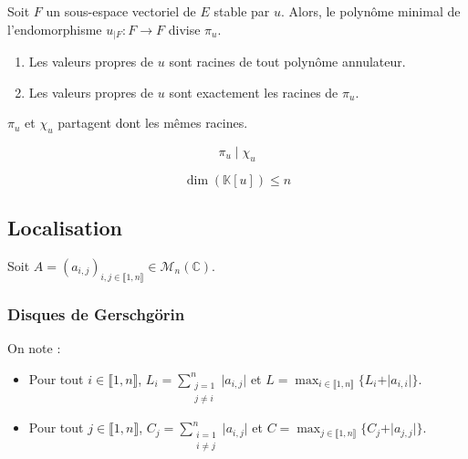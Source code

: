   \begin{proposition}
    Soit $F$ un sous-espace vectoriel de $E$ stable par $u$. Alors, le polynôme minimal de l'endomorphisme $u_{|F} : F \rightarrow F$ divise $\pi_u$.
  \end{proposition}

  \begin{proposition}
    \begin{enumerate}[label=(\roman*)]
      \item Les valeurs propres de $u$ sont racines de tout polynôme annulateur.
      \item Les valeurs propres de $u$ sont exactement les racines de $\pi_u$.
    \end{enumerate}
  \end{proposition}


  \begin{remark}
    $\pi_u$ et $\chi_u$ partagent dont les mêmes racines.
  \end{remark}


  \begin{theorem}
    \[ \pi_u \mid \chi_u \]
  \end{theorem}

  \begin{corollary}
    \[ \dim(\mathbb{K}[u]) \leq n \]
  \end{corollary}

  \subsection{Localisation}
  
  Soit $A = (a_{i,j})_{i, j \in \llbracket 1, n \rrbracket} \in \mathcal{M}_n(\mathbb{C})$.
  
  \subsubsection{Disques de Gerschgörin}
  
  
  \begin{notation}
    On note :
    \begin{itemize}
      \item Pour tout $i \in \llbracket 1, n \rrbracket$, $L_i = \sum_{\substack{j=1 \\ j \neq i}}^n \vert a_{i,j} \vert$ et $L = \max_{i \in \llbracket 1, n \rrbracket} \{ L_i + \vert a_{i,i} \vert \}$.
      \item Pour tout $j \in \llbracket 1, n \rrbracket$, $C_j = \sum_{\substack{i=1 \\ i \neq j}}^n \vert a_{i,j} \vert$ et $C = \max_{j \in \llbracket 1, n \rrbracket} \{ C_j + \vert a_{j,j} \vert \}$.
    \end{itemize}
  \end{notation}
  
